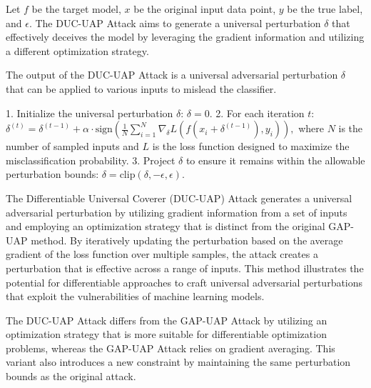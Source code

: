 Let \( f \) be the target model, \( x \) be the original input data point, \( y \) be the true label, and \( \epsilon \). The DUC-UAP Attack aims to generate a universal perturbation \( \delta \) that effectively deceives the model by leveraging the gradient information and utilizing a different optimization strategy.

The output of the DUC-UAP Attack is a universal adversarial perturbation \( \delta \) that can be applied to various inputs to mislead the classifier.

1. Initialize the universal perturbation \( \delta \):
   $
   \delta = 0.
   $
2. For each iteration \( t \):
   $
   \delta^{(t)} = \delta^{(t-1)} + \alpha \cdot \text{sign} \left( \frac{1}{N} \sum_{i=1}^N \nabla_{\delta} L(f(x_i + \delta^{(t-1)}), y_i) \right),
   $
   where \( N \) is the number of sampled inputs and \( L \) is the loss function designed to maximize the misclassification probability.
3. Project \( \delta \) to ensure it remains within the allowable perturbation bounds:
   $
   \delta = \text{clip}(\delta, -\epsilon, \epsilon).
   $

The Differentiable Universal Coverer (DUC-UAP) Attack generates a universal adversarial perturbation by utilizing gradient information from a set of inputs and employing an optimization strategy that is distinct from the original GAP-UAP method. By iteratively updating the perturbation based on the average gradient of the loss function over multiple samples, the attack creates a perturbation that is effective across a range of inputs. This method illustrates the potential for differentiable approaches to craft universal adversarial perturbations that exploit the vulnerabilities of machine learning models.

The DUC-UAP Attack differs from the GAP-UAP Attack by utilizing an optimization strategy that is more suitable for differentiable optimization problems, whereas the GAP-UAP Attack relies on gradient averaging. This variant also introduces a new constraint by maintaining the same perturbation bounds as the original attack.